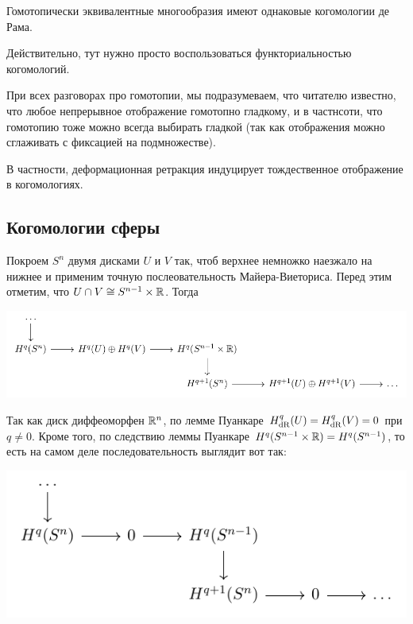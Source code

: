  		  \begin{corollary}
 		  	Гомотопически эквивалентные многообразия имеют однаковые когомологии де Рама. 
 		  \end{corollary}

 		  Действительно, тут нужно просто воспользоваться функториальностью когомологий. 

 		  \begin{remark}
 		  		При всех разговорах про гомотопии, мы подразумеваем, что читателю известно, что любое непрерывное отображение гомотопно гладкому, и в частнсоти, что гомотопию тоже можно всегда выбирать гладкой (так как отображения можно сглаживать с фиксацией на подмножестве). 
 		  \end{remark}

 		  \begin{corollary}
 		  	В частности, деформационная ретракция индуцирует тождественное отображение в когомологиях. 
 		  \end{corollary}

 		  \subsection{Когомологии сферы}

 		  Покроем $S^n$ двумя дисками $U$ и $V$ так, чтоб верхнее немножко наезжало на нижнее и применим точную послеовательность Майера-Виеториса. Перед этим отметим, что $U \cap V \cong S^{n - 1} \times \mathbb{R}$. Тогда 
 		  \begin{center}
 		  		\includegraphics{lectures/7/pictures/cd_15.pdf}
 		  \end{center}

 		  Так как диск диффеоморфен $\mathbb{R}^n$, по лемме Пуанкаре $H^{q}_{\operatorname{dR}}(U) = H^{q}_{\operatorname{dR}}(V) = 0$ при $q \neq 0$. Кроме того, по следствию леммы Пуанкаре $H^{q}(S^{n - 1} \times \mathbb{R}) = H^q(S^{n - 1})$, то есть на самом деле последовательность выглядит вот так: 

 		  \begin{center}
 		  	\includegraphics{lectures/7/pictures/cd_16.pdf}
 		  \end{center} 

